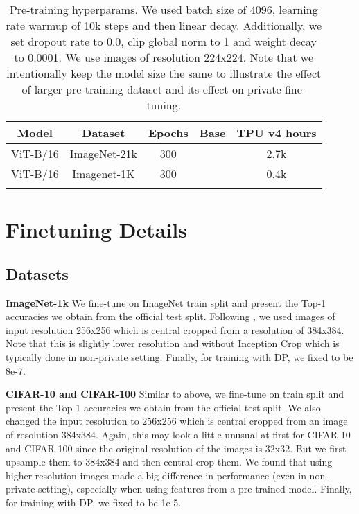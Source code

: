 \documentclass[letterpaper]{article} \usepackage{fullpage}
\begin{document}
\begin{table}[H]
    \centering
\begin{tabular}{c|c|c|c|c}
    \toprule
        Model & Dataset & Epochs & Base  & TPU v4 hours\\
        \midrule
      ViT-B/16 & ImageNet-21k & 300 &  & 2.7k \\
      ViT-B/16 & Imagenet-1K & 300 &  & 0.4k \\
         \bottomrule
         \addlinespace[0.3cm]
    \end{tabular}
        \caption{Pre-training hyperparams. We used batch size of 4096, learning rate warmup of 10k steps and then linear decay. Additionally, we set dropout rate to 0.0, clip global norm to 1 and weight decay to 0.0001. We use images of resolution 224x224. Note that we intentionally keep the model size the same to illustrate the effect of larger pre-training dataset and its effect on private fine-tuning.}
            \label{tab:learning_rate}
\end{table}

\section{Finetuning Details}

\subsection{Datasets}

\textbf{ImageNet-1k} We fine-tune on ImageNet train split and present the Top-1 accuracies we obtain from the official test split. Following \cite{mehta2022large}, we used images of input resolution 256x256 which is central cropped from a resolution of 384x384. Note that this is slightly lower resolution and without Inception Crop \citep{Szegedy2015GoingDW_inception} which is typically done in non-private setting. Finally, for training with DP, we fixed  to be 8e-7.

\textbf{CIFAR-10 and CIFAR-100} Similar to above, we fine-tune on train split and present the Top-1 accuracies we obtain from the official test split. We also changed the input resolution to 256x256 which is central cropped from an image of resolution 384x384. Again, this may look a little unusual at first for CIFAR-10 and CIFAR-100 since the original resolution of the images is 32x32. But we first upsample them to 384x384 and then central crop them. We found that using higher resolution images made a big difference in performance (even in non-private setting), especially when using features from a pre-trained model. Finally, for training with DP, we fixed  to be 1e-5.
\end{document}
